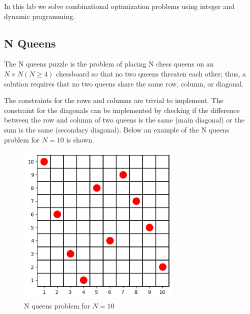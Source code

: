 In this lab we solve combinational optimization problems using integer and dynamic programming.
\subsection{N Queens}
The N queens puzzle is the problem of placing N chess queens on an $N\times N (N\ge 4)$ chessboard so that no two queens threaten each other; thus, a solution requires that no two queens share the same row, column, or diagonal.

The constraints for the rows and columns are trivial to implement. The constraint for the diagonals can be implemented by checking if the difference between the row and column of two queens is the same (main diagonal) or the sum is the same (secondary diagonal).
Below an example of the N queens problem for $N=10$ is shown.
\begin{figure}[H]
    \centering
    \includegraphics[width=0.7\textwidth]{lab11/imgs/nqueens.png}
    \caption{N queens problem for $N=10$}
    \label{fig:nqueens}
\end{figure}


